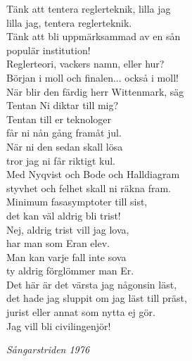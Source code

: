 \documentclass[a6paper,10pt]{article}
\begin{document}
\setlength{\oddsidemargin}{-0.37in}
\noindent
\begin{center}
\end{center}
Tänk att tentera reglerteknik, lilla jag \\
lilla jag, tentera reglerteknik. \\
Tänk att bli uppmärksammad av en sån \\
populär institution!
\vspace{5pt} \\
Reglerteori, vackers namn, eller hur? \\
Början i moll och finalen... också i moll! \\
När blir den färdig herr Wittenmark, säg \\
Tentan Ni diktar till mig?
\vspace{5pt} \\
Tentan till er teknologer \\
får ni nån gång framåt jul. \\
När ni den sedan skall lösa\\
tror jag ni får riktigt kul. \\
Med Nyqvist och Bode och Halldiagram \\
styvhet och felhet skall ni räkna fram.\\
Minimum fasasymptoter till sist, \\
det kan väl aldrig bli trist!
\vspace{5pt} \\
Nej, aldrig trist vill jag lova, \\
har man som Eran elev. \\
Man kan varje fall inte sova \\
ty aldrig förglömmer man Er. \\
Det här är det värsta jag någonsin läst, \\
det hade jag sluppit om jag läst till präst, \\
jurist eller annat som nytta ej gör. \\
Jag vill bli civilingenjör!
\begin{flushright}
\textit{Sångarstriden 1976}
\end{flushright}
\end{document}
